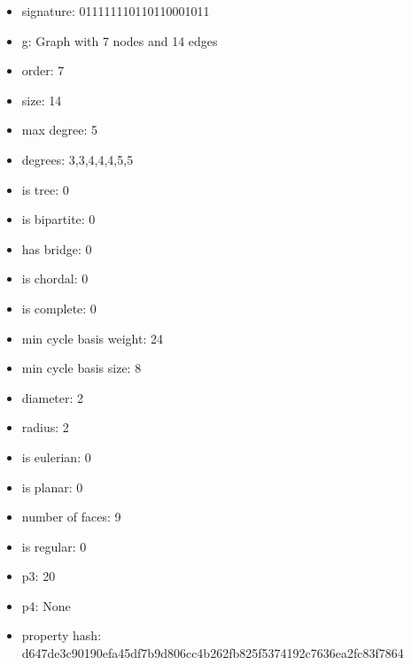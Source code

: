 \begin{itemize}
\item signature: 011111110110110001011
\item g: Graph with 7 nodes and 14 edges
\item order: 7
\item size: 14
\item max degree: 5
\item degrees: 3,3,4,4,4,5,5
\item is tree: 0
\item is bipartite: 0
\item has bridge: 0
\item is chordal: 0
\item is complete: 0
\item min cycle basis weight: 24
\item min cycle basis size: 8
\item diameter: 2
\item radius: 2
\item is eulerian: 0
\item is planar: 0
\item number of faces: 9
\item is regular: 0
\item p3: 20
\item p4: None
\item property hash: d647de3c90190efa45df7b9d806cc4b262fb825f5374192c7636ea2fc83f7864
\end{itemize}
\newpage
\begin{figure}
\end{figure}
